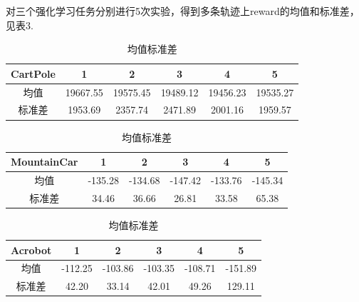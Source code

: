 \documentclass[a4paper,UTF8]{article}
\theoremstyle{definition}
\begin{document}
对三个强化学习任务分别进行5次实验，得到多条轨迹上reward的均值和标准差，见表3.
\begin{table}[!htbp]
	\centering
	\caption{均值标准差}
	\begin{tabular}{|c|c|c|c|c|c|}
	
		\hline
		
		\hline
		
		CartPole & 1 & 2 & 3 & 4 & 5 \\
		
		\hline
		
		均值 & 19667.55 & 19575.45 & 19489.12 & 19456.23 & 19535.27\\

		\hline

		标准差 & 1953.69 & 2357.74 & 2471.89 & 2001.16 & 1959.57\\
		
		\hline
	
	\end{tabular}
	
	\begin{tabular}{|c|c|c|c|c|c|}
	
		\hline
		
		\hline
		
		MountainCar & 1 & 2 & 3 & 4 & 5 \\
		
		\hline
		
		均值 & -135.28 & -134.68 & -147.42 & -133.76 & -145.34\\

		\hline

		标准差 & 34.46 & 36.66 & 26.81 & 33.58 & 65.38\\
		
		\hline
	
	\end{tabular}
	
	\begin{tabular}{|c|c|c|c|c|c|}
	
		\hline
		
		\hline
		
		Acrobot & 1 & 2 & 3 & 4 & 5 \\
		
		\hline
		
		均值 & -112.25 & -103.86 & -103.35 & -108.71 & -151.89\\

		\hline

		标准差 & 42.20 & 33.14 & 42.01 & 49.26 & 129.11\\
		
		\hline
	
	\end{tabular}
\end{table}
\end{document}
